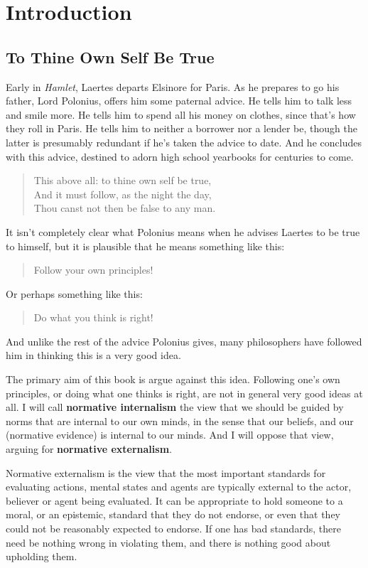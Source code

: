 \chapter{Introduction}
\label{introduction}

\section{To Thine Own Self Be True}
\label{tothineownselfbetrue}

Early in \emph{Hamlet}, Laertes departs Elsinore for Paris. As he prepares to go his father, Lord Polonius, offers him some paternal advice. He tells him to talk less and smile more. He tells him to spend all his money on clothes, since that's how they roll in Paris. He tells him to neither a borrower nor a lender be, though the latter is presumably redundant if he's taken the advice to date. And he concludes with this advice, destined to adorn high school yearbooks for centuries to come.

\begin{quote}
This above all: to thine own self be true,\\
And it must follow, as the night the day,\\
Thou canst not then be false to any man.
\end{quote}
It isn't completely clear what Polonius means when he advises Laertes to be true to himself, but it is plausible that he means something like this:

\begin{quote}
Follow your own principles!
\end{quote}
Or perhaps something like this:

\begin{quote}
Do what you think is right!
\end{quote}
And unlike the rest of the advice Polonius gives, many philosophers have followed him in thinking this is a very good idea.

The primary aim of this book is argue against this idea. Following one's own principles, or doing what one thinks is right, are not in general very good ideas at all. I will call \textbf{normative internalism} the view that we should be guided by norms that are internal to our own minds, in the sense that our beliefs, and our (normative evidence) is internal to our minds. And I will oppose that view, arguing for \textbf{normative externalism}.

Normative externalism is the view that the most important standards for evaluating actions, mental states and agents are typically external to the actor, believer or agent being evaluated. It can be appropriate to hold someone to a moral, or an epistemic, standard that they do not endorse, or even that they could not be reasonably expected to endorse. If one has bad standards, there need be nothing wrong in violating them, and there is nothing good about upholding them.

